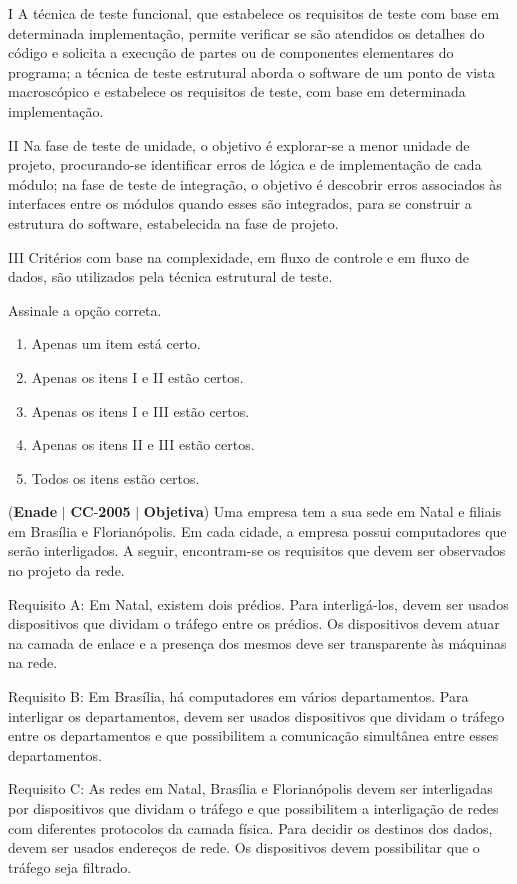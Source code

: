 \documentclass{exam}
\begin{document}
\begin{questions}
I A técnica de teste funcional, que estabelece os requisitos de
teste com base em determinada implementação, permite
verificar se são atendidos os detalhes do código e solicita a
execução de partes ou de componentes elementares do
programa; a técnica de teste estrutural aborda o software de
um ponto de vista macroscópico e estabelece os requisitos
de teste, com base em determinada implementação.

II Na fase de teste de unidade, o objetivo é explorar-se a
menor unidade de projeto, procurando-se identificar erros de
lógica e de implementação de cada módulo; na fase de teste
de integração, o objetivo é descobrir erros associados às
interfaces entre os módulos quando esses são integrados,
para se construir a estrutura do software, estabelecida na
fase de projeto.

III Critérios com base na complexidade, em fluxo de controle
e em fluxo de dados, são utilizados pela técnica estrutural de
teste.

Assinale a opção correta.
	\begin{enumerate}[label=\alph*)]
		\item  Apenas um item está certo.
		\item  Apenas os itens I e II estão certos.
		\item  Apenas os itens I e III estão certos.
		\item  Apenas os itens II e III estão certos.
		\item  Todos os itens estão certos.
	\end{enumerate}

\question (\textbf{Enade} $|$ \textbf{CC}-\textbf{2005} $|$ \textbf{Objetiva})
Uma empresa tem a sua sede em Natal e filiais em Brasília e
Florianópolis. Em cada cidade, a empresa possui computadores que
serão interligados. A seguir, encontram-se os requisitos que devem
ser observados no projeto da rede.

Requisito A: Em Natal, existem dois prédios. Para interligá-los,
devem ser usados dispositivos que dividam o tráfego entre os prédios.
Os dispositivos devem atuar na camada de enlace e a presença dos
mesmos deve ser transparente às máquinas na rede.

Requisito B: Em Brasília, há computadores em vários departamentos.
Para interligar os departamentos, devem ser usados dispositivos que
dividam o tráfego entre os departamentos e que possibilitem a
comunicação simultânea entre esses departamentos.

Requisito C: As redes em Natal, Brasília e Florianópolis devem ser
interligadas por dispositivos que dividam o tráfego e que possibilitem
a interligação de redes com diferentes protocolos da camada física.
Para decidir os destinos dos dados, devem ser usados endereços de
rede. Os dispositivos devem possibilitar que o tráfego seja filtrado.


\end{questions}
\end{document}
